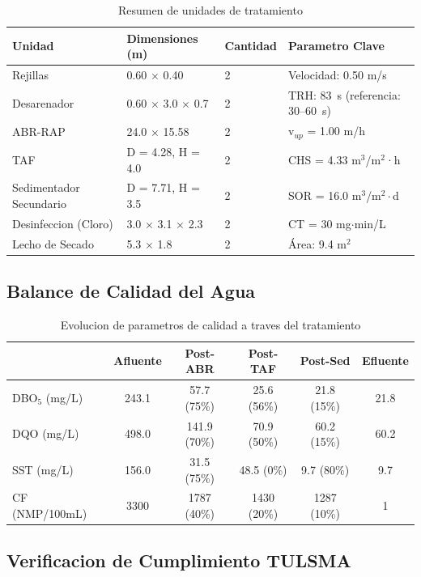 \documentclass[12pt,a4paper]{article}
\begin{document}
\begin{table}[H]
\centering
\caption{Resumen de unidades de tratamiento}
\small
\begin{tabular}{p{3.2cm}p{3.5cm}p{1.5cm}p{4.8cm}}
\toprule
\textbf{Unidad} & \textbf{Dimensiones (m)} & \textbf{Cantidad} & \textbf{Parametro Clave} \\
\midrule
Rejillas & 0.60 $\times$ 0.40 & 2 & Velocidad: 0.50 m/s \\
Desarenador & 0.60 $\times$ 3.0 $\times$ 0.7 & 2 & TRH: 83~s (referencia: 30--60~s) \\
ABR-RAP & 24.0 $\times$ 15.58 & 2 & v$_{up}$ = 1.00 m/h \\
TAF & D = 4.28, H = 4.0 & 2 & CHS = 4.33 m$^3$/m$^2$·h \\
Sedimentador Secundario & D = 7.71, H = 3.5 & 2 & SOR = 16.0 m$^3$/m$^2\cdot$d \\
Desinfeccion (Cloro) & 3.0 $\times$ 3.1 $\times$ 2.3 & 2 & CT = 30 mg$\cdot$min/L \\
Lecho de Secado & 5.3 $\times$ 1.8 & 2 & Área: 9.4 m$^2$ \\
\bottomrule
\end{tabular}
\end{table}

\subsection{Balance de Calidad del Agua}

\begin{table}[H]
\centering
\caption{Evolucion de parametros de calidad a traves del tratamiento}
\begin{tabular}{lccccc}
\toprule
\textbf{} & \textbf{Afluente} & \textbf{Post-ABR} & \textbf{Post-TAF} & \textbf{Post-Sed} & \textbf{Efluente} \\
\midrule
DBO$_5$ (mg/L) & 243.1 & 57.7 (75\%) & 25.6 (56\%) & 21.8 (15\%) & 21.8 \\
DQO (mg/L) & 498.0 & 141.9 (70\%) & 70.9 (50\%) & 60.2 (15\%) & 60.2 \\
SST (mg/L) & 156.0 & 31.5 (75\%) & 48.5 (0\%) & 9.7 (80\%) & 9.7 \\
CF (NMP/100mL) & 3300 & 1787 (40\%) & 1430 (20\%) & 1287 (10\%) & 1 \\
\bottomrule
\end{tabular}
\end{table}

\subsection{Verificacion de Cumplimiento TULSMA}
\end{document}
